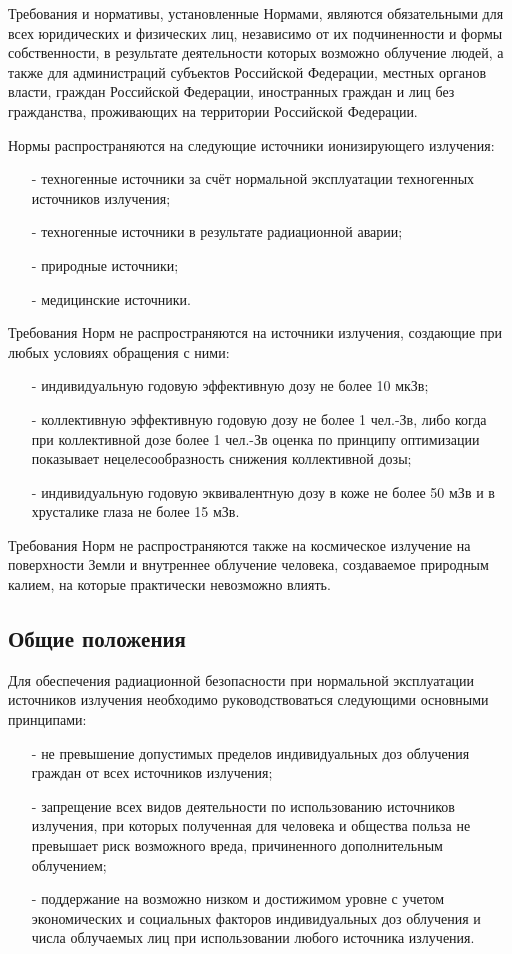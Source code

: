 	Требования и нормативы, установленные Нормами, являются обязательными 
	для всех юридических и физических лиц, независимо от их подчиненности и 
	формы собственности, в результате деятельности которых возможно облучение 
	людей, а также для администраций субъектов Российской Федерации, местных 
	органов власти, граждан Российской Федерации, иностранных граждан и лиц без 
	гражданства, проживающих на территории Российской Федерации.

	Нормы распространяются на следующие  источники ионизирующего излучения:
	\begin{itemize}
		\item[-] техногенные источники за счёт нормальной эксплуатации 
			техногенных источников излучения;
		\item[-] техногенные источники в результате радиационной аварии;
		\item[-] природные  источники;
		\item[-] медицинские источники.
	\end{itemize}

	Требования Норм не распространяются на источники излучения, создающие при 
	любых условиях обращения с ними: 
	\begin{itemize}
		\item[-] индивидуальную годовую эффективную дозу не более 10 мкЗв;
		\item[-] коллективную эффективную годовую дозу не более 1 чел.-Зв, 
			либо когда при коллективной дозе более 1 чел.-Зв оценка по принципу 
			оптимизации показывает нецелесообразность снижения коллективной дозы;
		\item[-] индивидуальную годовую эквивалентную дозу в коже не более 50 
			мЗв и в хрусталике глаза не более 15 мЗв.
	\end{itemize}
	
	Требования Норм не распространяются также на космическое излучение на 
	поверхности Земли и внутреннее облучение человека, создаваемое природным 
	калием, на которые практически невозможно влиять.

\subsection{Общие положения} \label{subsect1_2_2}
	Для  обеспечения радиационной безопасности при нормальной эксплуатации 
	источников излучения необходимо руководствоваться следующими основными 
	принципами:
	\begin{itemize}
		\item[-] не превышение допустимых пределов индивидуальных доз облучения 
			граждан от всех источников  излучения;
		\item[-] запрещение всех видов деятельности по использованию 
			источников излучения, при которых полученная для человека и 
			общества польза не превышает риск возможного вреда, 
			причиненного дополнительным облучением;
		\item[-] поддержание на возможно низком и достижимом уровне с учетом 
			экономических и социальных факторов индивидуальных доз облучения и 
			числа облучаемых лиц при использовании любого источника излучения.
	\end{itemize}

